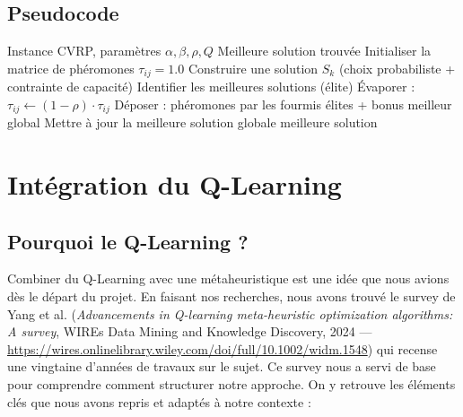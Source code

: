 \documentclass[12pt, a4paper]{article}
\begin{document}
\subsection{Pseudocode}

\begin{algorithm}[H]
\caption{ACO classique pour le CVRP}
\begin{algorithmic}[1]
\REQUIRE Instance CVRP, paramètres $\alpha, \beta, \rho, Q$
\ENSURE Meilleure solution trouvée
\STATE Initialiser la matrice de phéromones $\tau_{ij} = 1.0$
        \STATE Construire une solution $S_k$ (choix probabiliste + contrainte de capacité)
    \ENDFOR
    \STATE Identifier les meilleures solutions (élite)
    \STATE Évaporer : $\tau_{ij} \leftarrow (1-\rho) \cdot \tau_{ij}$
    \STATE Déposer : phéromones par les fourmis élites + bonus meilleur global
    \STATE Mettre à jour la meilleure solution globale
\ENDFOR
\RETURN meilleure solution
\end{algorithmic}
\end{algorithm}

\section{Intégration du Q-Learning}

\subsection{Pourquoi le Q-Learning ?}

Combiner du Q-Learning avec une métaheuristique est une idée que nous avions dès le départ du projet. En faisant nos recherches, nous avons trouvé le survey de Yang et al. (\textit{Advancements in Q-learning meta-heuristic optimization algorithms: A survey}, WIREs Data Mining and Knowledge Discovery, 2024 --- \url{https://wires.onlinelibrary.wiley.com/doi/full/10.1002/widm.1548}) qui recense une vingtaine d'années de travaux sur le sujet. Ce survey nous a servi de base pour comprendre comment structurer notre approche. On y retrouve les éléments clés que nous avons repris et adaptés à notre contexte :
\end{document}
